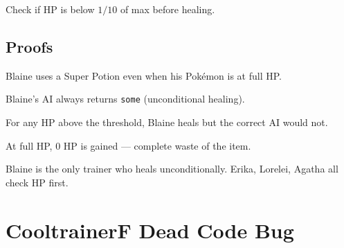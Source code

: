 \begin{definition}\label{def:blaine_correct}
  \leanok
  Check if HP is below $1/10$ of max before healing.
\end{definition}

\section{Proofs}

\begin{theorem}\label{thm:blaine_heals_full}
  \leanok
  Blaine uses a Super Potion even when his Pok\'emon is at full HP.
\end{theorem}

\begin{theorem}\label{thm:blaine_always_heals}
  \leanok
  Blaine's AI always returns \texttt{some} (unconditional healing).
\end{theorem}

\begin{theorem}\label{thm:blaine_wastes}
  \leanok
  For any HP above the threshold, Blaine heals but the correct AI would not.
\end{theorem}

\begin{theorem}\label{thm:full_hp_zero_gain}
  \leanok
  At full HP, 0 HP is gained --- complete waste of the item.
\end{theorem}

\begin{theorem}\label{thm:blaine_unique}
  \leanok
  Blaine is the only trainer who heals unconditionally. Erika, Lorelei, Agatha all check HP first.
\end{theorem}

\chapter{CooltrainerF Dead Code Bug}\label{ch:cooltrainerf}

